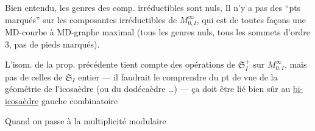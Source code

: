 Bien entendu, les genres des comp. irréductibles sont nuls, Il n'y a pas  des ``pts marqués'' sur  les  composantes irréductibles de $M^\infty_{0,I}$, qui est de toutes façons une MD-courbe  à MD-graphe maximal (tous les genres nuls, tous les sommets d'ordre $3$, pas de pieds marqués).

L'isom. de la prop. précédente tient compte des opérations de $\mathfrak S_I^+$  sur $M^\infty_{0,I}$, mais pas de celles de $\mathfrak S_I$  entier --- il faudrait le comprendre du pt de vue de la géométrie de l'icosaèdre  (ou du dodécaèdre \ldots) --- ça doit être lié bien sûr au \uline{bi-icosaèdre} gauche combinatoire\unsure{)|]}

Quand on passe à la multiplicité modulaire


